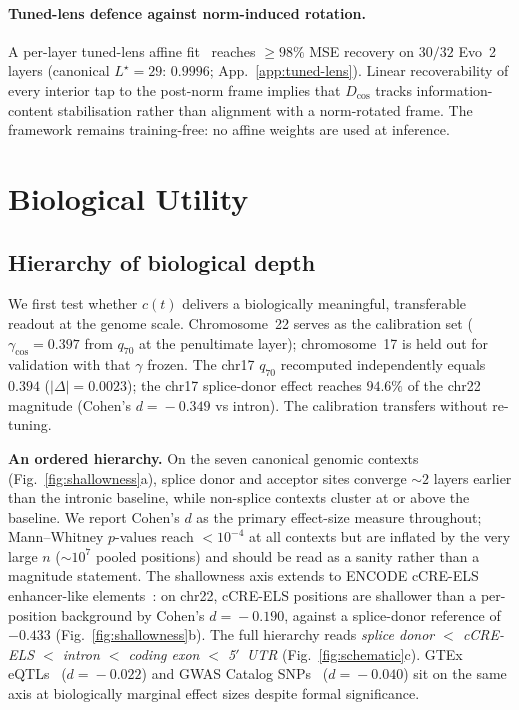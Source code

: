 \documentclass{article}
\theoremstyle{plain}
\theoremstyle{definition}
\theoremstyle{remark}
\newcommand{\Dcos}{D_{\cos}}
\begin{document}
\paragraph{Tuned-lens defence against norm-induced rotation.} A per-layer tuned-lens affine fit~\cite{belrose2023tunedlens} reaches $\ge 98\%$ MSE recovery on $30/32$ Evo~2 layers (canonical $L^\star\!=\!29$: $0.9996$; App.~\ref{app:tuned-lens}). Linear recoverability of every interior tap to the post-norm frame implies that $\Dcos$ tracks information-content stabilisation rather than alignment with a norm-rotated frame. The framework remains training-free: no affine weights are used at inference.


\section{Biological Utility}
\label{sec:utility}

\subsection{Hierarchy of biological depth}
\label{sec:shallowness}

We first test whether $c(t)$ delivers a biologically meaningful, transferable readout at the genome scale. Chromosome~22 serves as the calibration set ($\gamma_{\cos}\!=\!0.397$ from $q_{70}$ at the penultimate layer); chromosome~17 is held out for validation with that $\gamma$ frozen. The chr17 $q_{70}$ recomputed independently equals $0.394$ ($|\Delta|\!=\!0.0023$); the chr17 splice-donor effect reaches $94.6\%$ of the chr22 magnitude (Cohen's $d\!=\!-0.349$ vs intron). The calibration transfers without re-tuning.

\textbf{An ordered hierarchy.} On the seven canonical genomic contexts (Fig.~\ref{fig:shallowness}a), splice donor and acceptor sites converge $\sim 2$ layers earlier than the intronic baseline, while non-splice contexts cluster at or above the baseline. We report Cohen's $d$ as the primary effect-size measure throughout; Mann--Whitney $p$-values reach $<\!10^{-4}$ at all contexts but are inflated by the very large $n$ ($\sim\!10^7$ pooled positions) and should be read as a sanity rather than a magnitude statement. The shallowness axis extends to ENCODE cCRE-ELS enhancer-like elements~\cite{moore2020encode}: on chr22, cCRE-ELS positions are shallower than a per-position background by Cohen's $d\!=\!-0.190$, against a splice-donor reference of $-0.433$ (Fig.~\ref{fig:shallowness}b). The full hierarchy reads \emph{splice donor $<$ cCRE-ELS $<$ intron $<$ coding exon $<$ 5$'$~UTR} (Fig.~\ref{fig:schematic}c). GTEx eQTLs~\cite{gtex2020} ($d\!=\!-0.022$) and GWAS Catalog SNPs~\cite{sollis2023gwas} ($d\!=\!-0.040$) sit on the same axis at biologically marginal effect sizes despite formal significance.
\end{document}
